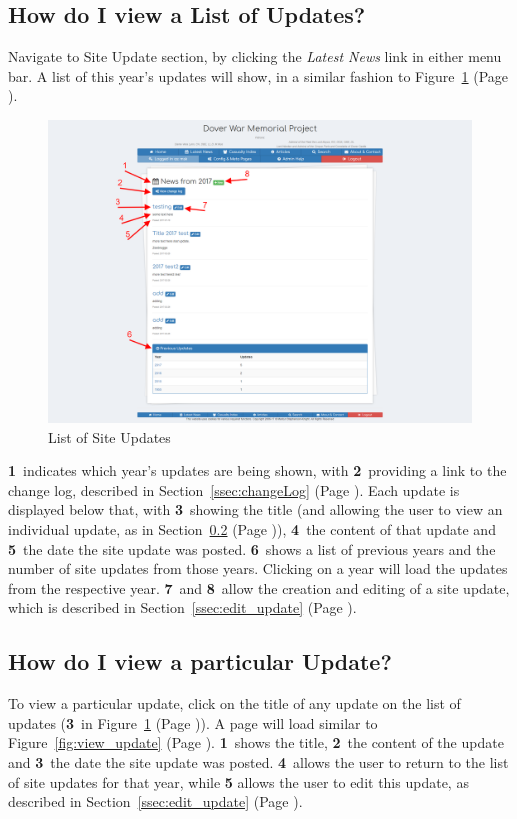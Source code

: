 \documentclass[12pt]{article}
\newcommand{\marker}[1]{\color{red}\textbf{#1}\color{black}}
\newcommand{\myref}[1]{\ref{#1} {\scriptsize(Page \pageref{#1})}}
\begin{document}
\subsection{How do I view a List of Updates?}\label{ssec:view_updates}

Navigate to Site Update section, by clicking the \textit{Latest News} link in either menu bar. A list of this year's updates will show, in a similar fashion to Figure~\myref{fig:view_updates}.

\begin{figure}[h]
  \centering
 \includegraphics[width=.9\textwidth]{pics/view_updates.png}
	\caption{List of Site Updates}\label{fig:view_updates}
\end{figure}

\marker{1}\ indicates which year's updates are being shown, with \marker{2}\ providing a link to the change log, described in Section~\myref{ssec:changeLog}. Each update is displayed below that, with \marker{3}\ showing the title (and allowing the user to view an individual update, as in Section~\myref{ssec:view_update}), \marker{4}\ the content of that update and \marker{5}\ the date the site update was posted. \marker{6}\ shows a list of previous years and the number of site updates from those years. Clicking on a year will load the updates from the respective year. \marker{7}\ and \marker{8}\ allow the creation and editing of a site update, which is described in Section~\myref{ssec:edit_update}.

\newpage
\FloatBarrier
\subsection{How do I view a particular Update?}\label{ssec:view_update}
To view a particular update, click on the title of any update on the list of updates (\marker{3}\ in Figure~\myref{fig:view_updates}). A page will load similar to Figure~\myref{fig:view_update}. \marker{1}\ shows the title, \marker{2}\ the content of the update and \marker{3}\ the date the site update was posted. \marker{4}\ allows the user to return to the list of site updates for that year, while \marker{5} allows the user to edit this update, as described in Section~\myref{ssec:edit_update}.
\end{document}
